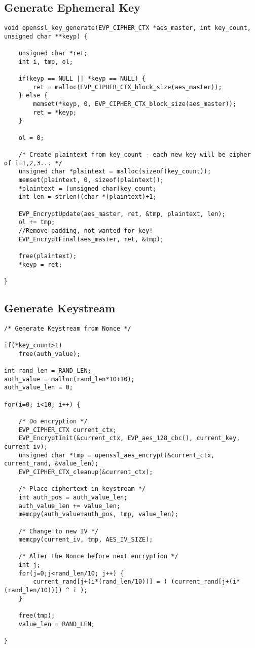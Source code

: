 \subsection{Generate Ephemeral Key}\label{code:gen_eph_key}
\begin{lstlisting}[frame=tb]
void openssl_key_generate(EVP_CIPHER_CTX *aes_master, int key_count, unsigned char **keyp) {

	unsigned char *ret;
	int i, tmp, ol;

	if(keyp == NULL || *keyp == NULL) {
		ret = malloc(EVP_CIPHER_CTX_block_size(aes_master));
	} else {
		memset(*keyp, 0, EVP_CIPHER_CTX_block_size(aes_master));
		ret = *keyp;
	}

	ol = 0;

	/* Create plaintext from key_count - each new key will be cipher of i=1,2,3... */
	unsigned char *plaintext = malloc(sizeof(key_count));
	memset(plaintext, 0, sizeof(plaintext));
	*plaintext = (unsigned char)key_count;
	int len = strlen((char *)plaintext)+1;

	EVP_EncryptUpdate(aes_master, ret, &tmp, plaintext, len);
	ol += tmp;
	//Remove padding, not wanted for key!
	EVP_EncryptFinal(aes_master, ret, &tmp);

	free(plaintext);
	*keyp = ret;

}
\end{lstlisting}


\subsection{Generate Keystream}\label{code:gen_keystream}
\begin{lstlisting}[frame=tb]
/* Generate Keystream from Nonce */

if(*key_count>1)
	free(auth_value);

int rand_len = RAND_LEN;
auth_value = malloc(rand_len*10+10);
auth_value_len = 0;

for(i=0; i<10; i++) {

	/* Do encryption */
	EVP_CIPHER_CTX current_ctx;
	EVP_EncryptInit(&current_ctx, EVP_aes_128_cbc(), current_key, current_iv);
	unsigned char *tmp = openssl_aes_encrypt(&current_ctx, current_rand, &value_len);
	EVP_CIPHER_CTX_cleanup(&current_ctx);

	/* Place ciphertext in keystream */
	int auth_pos = auth_value_len;
	auth_value_len += value_len;
	memcpy(auth_value+auth_pos, tmp, value_len);

	/* Change to new IV */
	memcpy(current_iv, tmp, AES_IV_SIZE);

	/* Alter the Nonce before next encryption */
	int j;
	for(j=0;j<rand_len/10; j++) {
		current_rand[j+(i*(rand_len/10))] = ( (current_rand[j+(i*(rand_len/10))]) ^ i );
	}
	
	free(tmp);
	value_len = RAND_LEN;

}
\end{lstlisting}

